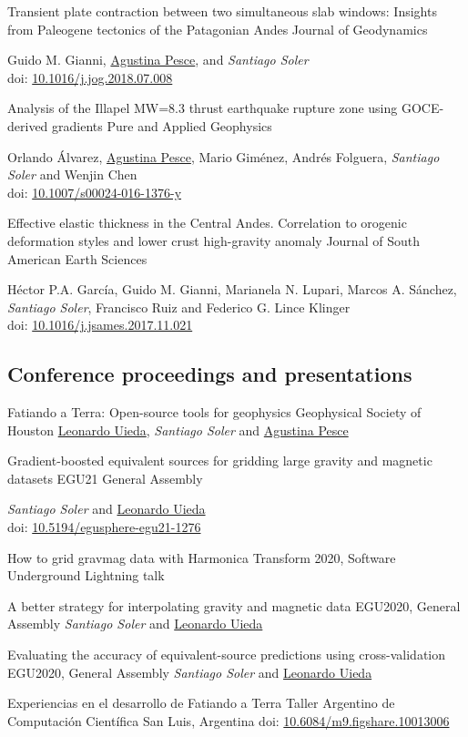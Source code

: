\documentclass[a4paper,12pt]{moderncv}
\newcommand{\me}{\emph{Santiago Soler}}
\newcommand{\agustina}{\href{https://aguspesce.github.io}{Agustina Pesce}}
\newcommand{\guido}{Guido M. Gianni}
\newcommand{\leo}{\href{https://www.leouieda.com}{Leonardo Uieda}}
\newcommand{\mario}{Mario Giménez}
\newcommand{\orlando}{Orlando Álvarez}
\newcommand{\folguera}{Andrés Folguera}
\newcommand{\wenjinchen}{Wenjin Chen}
\newcommand{\pichu}{Héctor P.A. García}
\newcommand{\mae}{Marianela N. Lupari}
\newcommand{\marcos}{Marcos A. Sánchez}
\newcommand{\paco}{Francisco Ruiz}
\newcommand{\fede}{Federico G. Lince Klinger}
\newcommand{\doi}[1]{
    \href{https://doi.org/#1}{#1}
}
\begin{document}
{
    Transient plate contraction between two simultaneous slab windows:
    Insights from Paleogene tectonics of the Patagonian Andes
}
{Journal of Geodynamics}
{}
{}
{
    \guido{}, \agustina{}, and \me{}
    \\
    doi: \doi{10.1016/j.jog.2018.07.008}
}

{
    Analysis of the Illapel MW=8.3 thrust earthquake rupture zone using
    GOCE-derived gradients
}
{Pure and Applied Geophysics}
{}
{}
{
    \orlando{}, \agustina{}, \mario{}, \folguera{}, \me{} and \wenjinchen{}
    \\
    doi: \doi{10.1007/s00024-016-1376-y}
}

{
    Effective elastic thickness in the Central Andes.
    Correlation to orogenic deformation styles and lower crust high-gravity
    anomaly
}
{Journal of South American Earth Sciences}
{}
{}
{
    \pichu{}, \guido{}, \mae{}, \marcos{}, \me{}, \paco{} and \fede{}
    \\
    doi: \doi{10.1016/j.jsames.2017.11.021}
}


\newpage
\subsection{Conference proceedings and presentations}

{Fatiando a Terra: Open-source tools for geophysics}
{Geophysical Society of Houston}
{}
{}
{\leo{}, \me{} and \agustina{}}

{
    Gradient-boosted equivalent sources for gridding large gravity and
    magnetic datasets
}
{EGU21 General Assembly}
{}
{}
{
    \me{} and \leo{}
    \\
    doi: \doi{10.5194/egusphere-egu21-1276}
}

{How to grid gravmag data with Harmonica}
{Transform 2020, Software Underground}
{}
{Lightning talk}
{}

{A better strategy for interpolating gravity and magnetic data}
{EGU2020, General Assembly}
{}
{}
{\me{} and \leo{}}

{
    Evaluating the accuracy of equivalent-source predictions using
    cross-validation
}
{EGU2020, General Assembly}
{}
{}
{\me{} and \leo{}}

{Experiencias en el desarrollo de Fatiando a Terra}
{Taller Argentino de Computación Científica}
{San Luis, Argentina}
{}
{doi: \doi{10.6084/m9.figshare.10013006}}
\end{document}
